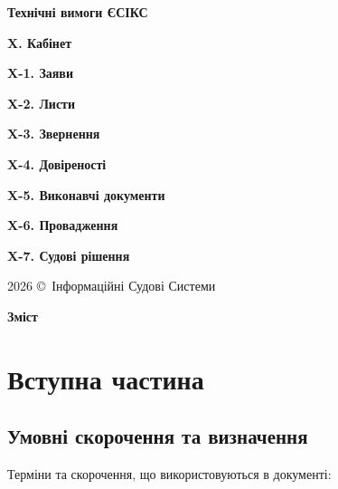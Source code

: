 \documentclass{article}
\newcommand\HUGE[1]{\fontsize{40}{40}\selectfont #1}
\begin{document}
\pagestyle{fancy}

\begin{titlepage}
  \AddToShipoutPictureBG*{\AtPageLowerLeft{\color{nato}\rule{\paperwidth}{\paperheight}}}
  \color{white}\thispagestyle{empty}\vspace*{4cm}\centering
  {\Huge  \textbf{Технічні вимоги ЄСІКС} \par} \vspace{2cm}
  {\HUGE  \textbf{X. Кабінет} \par} \vspace{2.5cm}
  {\LARGE \textbf{X-1. Заяви} \par}
  {\LARGE \textbf{X-2. Листи} \par}
  {\LARGE \textbf{X-3. Звернення} \par}
  {\LARGE \textbf{X-4. Довіреності} \par}
  {\LARGE \textbf{X-5. Виконавчі документи} \par}
  {\LARGE \textbf{X-6. Провадження} \par}
  {\LARGE \textbf{X-7. Судові рішення} \par}
  \vspace{2.5cm}
  \vfill
  {\large 2026 \copyright\ Інформаційні Судові Системи \par}
\end{titlepage}

\newpage

\begin{center}
  {\Huge\color{nato}\bfseries Зміст\par}
\end{center}
\vspace{40pt}
\tableofcontents

\begin{abstract}
ТЕХНІЧНІ ВИМОГИ НА СТВОРЕННЯ ЗАСОБУ ІНФОРМАТИЗАЦІЇ - КОМПОНЕНТІВ “ПОРТАЛ”, ІНФОРМАЦІЙНО-ПОШУКОВОЇ ПІДСИСТЕМИ
ЄДИНОЇ СУДОВОЇ ІНФОРМАЦІЙНО-КОМУНІКАЦІЙНОЇ СИСТЕМИ.
\end{abstract}

\newpage
\section*{Вступна частина}

\subsection*{Умовні скорочення та визначення}

Терміни та скорочення, що використовуються в документі:
\end{document}
